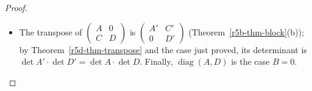 \documentclass[12pt]{article}
\DeclareMathOperator{\diag}{diag}
\theoremstyle{definition}
\begin{document}
\begin{proof}
\begin{itemize}
\[=\begin{pmatrix}I_p&0\\0&D\end{pmatrix}\begin{pmatrix}A&B\\0&I_q\end{pmatrix}=\begin{pmatrix}A&B\\0&D\end{pmatrix}
\]
and by Theorem~\ref{r5d-thm-product}(b) its determinant is \(\det D\cdot1\cdot\det A\).
\item The transpose of \(\left(\begin{smallmatrix}A&0\\C&D\end{smallmatrix}\right)\) is
\(\left(\begin{smallmatrix}A'&C'\\0&D'\end{smallmatrix}\right)\) (Theorem~\ref{r5b-thm-block}(b)); by
Theorem~\ref{r5d-thm-transpose} and the case just proved, its determinant is
\(\det A'\cdot\det D'=\det A\cdot\det D\). Finally, \(\diag(A,D)\) is the case \(B=0\).\qedhere
\end{itemize}
\end{proof}
\end{document}
